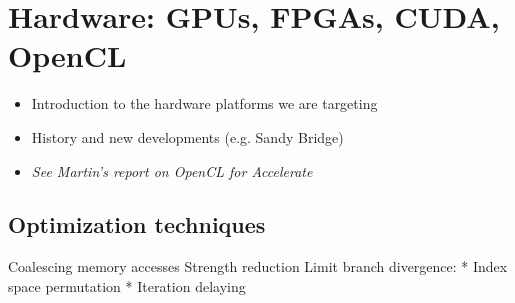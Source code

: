\chapter{Hardware: GPUs, FPGAs, CUDA, OpenCL}
\begin{itemize}
\item Introduction to the hardware platforms we are targeting
\item History and new developments (e.g. Sandy Bridge)
\item \textit{See Martin's report on OpenCL for Accelerate}
\end{itemize}


\section{Optimization techniques}

Coalescing memory accesses
Strength reduction
Limit branch divergence:
 * Index space permutation
 * Iteration delaying

